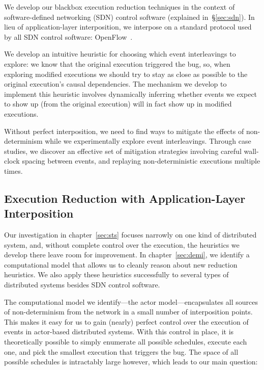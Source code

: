 We develop our blackbox execution reduction techniques
in the context of software-defined
networking (SDN) control software (explained in~\S\ref{sec:sdn}). In lieu of
application-layer interposition, we interpose on a standard
protocol used by all SDN control software: OpenFlow~\cite{openflow}.

We develop an intuitive heuristic for
choosing which event interleavings to explore: we know that the original execution triggered the bug, so, when exploring modified executions we should try to stay as close as possible to the original execution's causal dependencies.
The mechanism we develop to implement this heuristic involves dynamically inferring whether events we expect to show up (from the original execution) will in fact show up in modified executions.

Without perfect interposition, we need to find ways to mitigate the effects of
non-determinism while we experimentally explore event interleavings.
Through case studies, we discover an effective set of mitigation strategies involving careful wall-clock spacing between events, and replaying non-deterministic executions multiple times.

\subsection{Execution Reduction with Application-Layer Interposition}

Our investigation in chapter~\ref{sec:sts} focuses narrowly on one kind of
distributed system, and, without complete control over the execution, the heuristics we
develop there leave room for improvement. In chapter~\ref{sec:demi},
we identify a computational model that allows us to cleanly reason
about new reduction heuristics. We also apply these heuristics successfully
to several types of distributed systems besides SDN control software.

The computational model we identify---the actor model---encapsulates all sources of
non-determinism from the network in a small number of interposition points.
This makes it easy for us to gain (nearly) perfect control over the execution of events in actor-based distributed systems.
With this control in place, it is theoretically possible to simply enumerate all possible schedules, execute each one, and pick the smallest execution that triggers the bug.
The space of all possible schedules is intractably large however, which leads to our main question:

